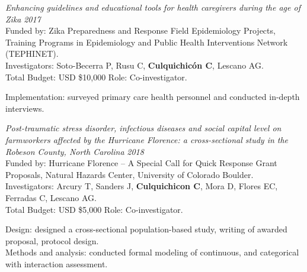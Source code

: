 \documentclass[10pt]{article}
\newenvironment{outerlist}[1][\enskip\textbullet]%
{\begin{itemize}[#1]}{\end{itemize}%
	\vspace{-0.6\baselineskip}}
\newenvironment{innerlist}[1][\enskip$\circ$]%
{\begin{compactitem}[#1]}{\end{compactitem}}
\begin{document}
\vspace{-0.10in}
\begin{outerlist}
	\item[] {\it Enhancing guidelines and educational tools for health caregivers during the age of Zika} \hfill {\it 2017} \\
	Funded by: Zika Preparedness and Response Field Epidemiology Projects, Training Programs in Epidemiology and Public Health Interventions Network (TEPHINET). \\
	Investigators: Soto-Becerra P, Rusu C, {\bf Culquichicón C}, Lescano AG. \\
	Total Budget: USD \$10,000  \hfill Role: Co-investigator.
	
	\begin{innerlist}
	\item[] 	Implementation: surveyed primary care health personnel and conducted in-depth interviews.
	\end{innerlist}
\end{outerlist}

\vspace{-0.10in}
\begin{outerlist}
	\item[] {\it Post-traumatic stress disorder, infectious diseases and social capital level on farmworkers affected by the Hurricane Florence: a cross-sectional study in the Robeson County, North Carolina} \hfill {\it 2018} \\
	Funded by: Hurricane Florence -- A Special Call for Quick Response Grant Proposals, Natural Hazards Center, University of Colorado Boulder. \\
	Investigators: Arcury T, Sanders J, {\bf Culquichicon C}, Mora D, Flores EC, Ferradas C, Lescano AG. \\
	Total Budget: USD \$5,000  \hfill Role: Co-investigator.
	
	\begin{innerlist}
	\item[] 	Design:  designed a cross-sectional population-based study, writing of awarded proposal, protocol design.\\
				Methods and analysis: conducted formal modeling of continuous, and categorical with interaction assessment.\\
	\end{innerlist}

\end{outerlist}

\vspace{-0.30in}
\end{document}
